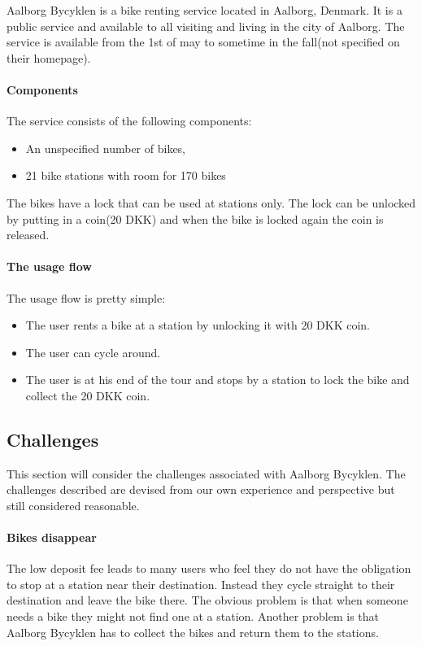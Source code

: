 \label{aalborg_bycyklen}
Aalborg Bycyklen is a bike renting service located in Aalborg, Denmark.
It is a public service and available to all visiting and living in the city of Aalborg.
The service is available from the 1st of may to sometime in the fall(not specified on their homepage).\cite{aalborgbycyklenbagcyklen}


\paragraph{Components}
The service consists of the following components:
\begin{itemize}
\item An unspecified number of bikes, 
\item 21 bike stations with room for 170 bikes
\end{itemize}
The bikes have a lock that can be used at stations only.
The lock can be unlocked by putting in a coin(20 DKK) and when the bike is locked again the coin is released.

\paragraph{The usage flow}
The usage flow is pretty simple:
\begin{itemize}
\item The user rents a bike at a station by unlocking it with 20 DKK coin.
\item The user can cycle around.
\item The user is at his end of the tour and stops by a station to lock the bike and collect the 20 DKK coin.
\end{itemize}

\subsection{Challenges}\label{aalborg_bycyklen:challenges}
This section will consider the challenges associated with Aalborg Bycyklen.
The challenges described are devised from our own experience and perspective but still considered reasonable.

\paragraph{Bikes disappear}
The low deposit fee leads to many users who feel they do not have the obligation to stop at a station near their destination.
Instead they cycle straight to their destination and leave the bike there.
The obvious problem is that when someone needs a bike they might not find one at a station.
Another problem is that Aalborg Bycyklen has to collect the bikes and return them to the stations.

